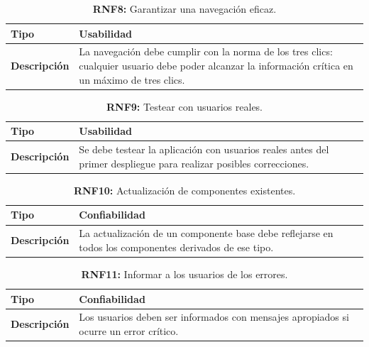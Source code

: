 \documentclass[a4paper, 12pt]{article}
\begin{document}
\begin{table}[H]
\captionsetup{list=no}%
\captionsetup{justification=raggedright,singlelinecheck=false}
\captionsetup{labelformat=empty}
\caption*{\textbf{RNF8:} Garantizar una navegación eficaz.}
\label{tab:RNF8}
    \begin{tabular}{|m{5cm}|m{10cm}|}
	    \hline
	    \textbf{Tipo} & Usabilidad \\ 
	    \hline
	    \textbf{Descripción} & La navegación debe cumplir con la norma de los tres clics: cualquier usuario debe poder alcanzar la información crítica en un  máximo de tres clics. \\ 
	    \hline
    \end{tabular}
\end{table}

\begin{table}[H]
\captionsetup{list=no}%
\captionsetup{justification=raggedright,singlelinecheck=false}
\captionsetup{labelformat=empty}
\caption*{\textbf{RNF9:} Testear con usuarios reales.}
\label{tab:RNF9}
    \begin{tabular}{|m{5cm}|m{10cm}|}
	    \hline
	    \textbf{Tipo} & Usabilidad \\ 
	    \hline
	    \textbf{Descripción} & Se debe testear la aplicación con usuarios reales antes del primer despliegue para realizar posibles correcciones. \\ 
	    \hline
    \end{tabular}
\end{table}

\begin{table}[H]
\captionsetup{list=no}%
\captionsetup{justification=raggedright,singlelinecheck=false}
\captionsetup{labelformat=empty}
\caption*{\textbf{RNF10:} Actualización de componentes existentes.}
\label{tab:RNF10}
    \begin{tabular}{|m{5cm}|m{10cm}|}
	    \hline
	    \textbf{Tipo} & Confiabilidad \\ 
	    \hline
	    \textbf{Descripción} & La actualización de un componente base debe reflejarse en todos los componentes derivados de ese tipo. \\ 
	    \hline
    \end{tabular}
\end{table}

\begin{table}[H]
\captionsetup{list=no}%
\captionsetup{justification=raggedright,singlelinecheck=false}
\captionsetup{labelformat=empty}
\caption*{\textbf{RNF11:} Informar a los usuarios de los errores.}
\label{tab:RNF11}
    \begin{tabular}{|m{5cm}|m{10cm}|}
	    \hline
	    \textbf{Tipo} & Confiabilidad \\ 
	    \hline
	    \textbf{Descripción} & Los usuarios deben ser informados con mensajes apropiados si ocurre un error crítico. \\ 
	    \hline
    \end{tabular}
\end{table}
\end{document}
